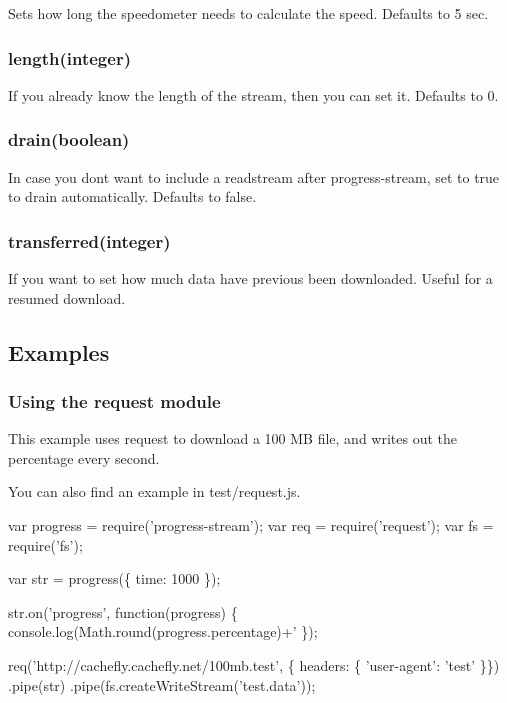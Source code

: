 Sets how long the speedometer needs to calculate the speed. Defaults to 5 sec.

\subsubsection*{length(integer)}

If you already know the length of the stream, then you can set it. Defaults to 0.

\subsubsection*{drain(boolean)}

In case you don\textquotesingle{}t want to include a readstream after progress-\/stream, set to true to drain automatically. Defaults to false.

\subsubsection*{transferred(integer)}

If you want to set how much data have previous been downloaded. Useful for a resumed download.

\subsection*{Examples}

\subsubsection*{Using the request module}

This example uses request to download a 100 MB file, and writes out the percentage every second.

You can also find an example in {\ttfamily test/request.\+js}.


\begin{DoxyCode}
var progress = require('progress-stream');
var req = require('request');
var fs = require('fs');

var str = progress(\{
    time: 1000
\});

str.on('progress', function(progress) \{
    console.log(Math.round(progress.percentage)+'%
\});

req('http://cachefly.cachefly.net/100mb.test', \{ headers: \{ 'user-agent': 'test' \}\})
    .pipe(str)
    .pipe(fs.createWriteStream('test.data'));
\end{DoxyCode}


